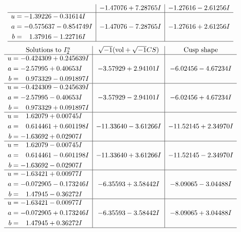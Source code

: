 \documentclass[1p]{elsarticle_modified}
\theoremstyle{definition}
\newcommand{\I}{\sqrt{-1}}
\begin{document}
$$\begin{array}{c|c|c}
 & -1.47076 + 7.28765 I & -1.27616 - 2.61256 I \\ \hline\begin{aligned}
u &= -1.39226 - 0.31614 I \\
a &= -0.575637 - 0.854749 I \\
b &= \phantom{-}1.37916 - 1.22716 I\end{aligned}
 & -1.47076 - 7.28765 I & -1.27616 + 2.61256 I\\
 \hline 
 \end{array}$$\newpage$$\begin{array}{c|c|c}  
\text{Solutions to }I^u_{2}& \I (\text{vol} + \sqrt{-1}CS) & \text{Cusp shape}\\
 \hline 
\begin{aligned}
u &= -0.424309 + 0.245639 I \\
a &= -2.57995 + 0.40653 I \\
b &= \phantom{-}0.973329 - 0.091897 I\end{aligned}
 & -3.57929 + 2.94101 I & -6.02456 - 4.67234 I \\ \hline\begin{aligned}
u &= -0.424309 - 0.245639 I \\
a &= -2.57995 - 0.40653 I \\
b &= \phantom{-}0.973329 + 0.091897 I\end{aligned}
 & -3.57929 - 2.94101 I & -6.02456 + 4.67234 I \\ \hline\begin{aligned}
u &= \phantom{-}1.62079 + 0.00745 I \\
a &= \phantom{-}0.614461 + 0.601198 I \\
b &= -1.63692 + 0.02907 I\end{aligned}
 & -11.33640 - 3.61266 I & -11.52145 + 2.34970 I \\ \hline\begin{aligned}
u &= \phantom{-}1.62079 - 0.00745 I \\
a &= \phantom{-}0.614461 - 0.601198 I \\
b &= -1.63692 - 0.02907 I\end{aligned}
 & -11.33640 + 3.61266 I & -11.52145 - 2.34970 I \\ \hline\begin{aligned}
u &= -1.63421 + 0.00977 I \\
a &= -0.072905 - 0.173246 I \\
b &= \phantom{-}1.47945 - 0.36272 I\end{aligned}
 & -6.35593 + 3.58442 I & -8.09065 - 3.04488 I \\ \hline\begin{aligned}
u &= -1.63421 - 0.00977 I \\
a &= -0.072905 + 0.173246 I \\
b &= \phantom{-}1.47945 + 0.36272 I\end{aligned}
 & -6.35593 - 3.58442 I & -8.09065 + 3.04488 I\\
 \hline 
 \end{array}$$\newpage\newpage\renewcommand{\arraystretch}{1}
\end{document}
